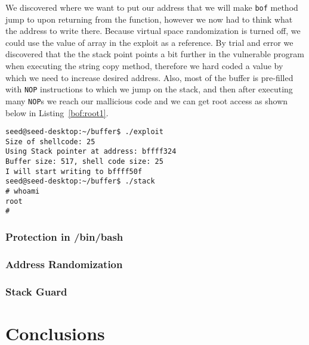 \documentclass[12pt, a4paper, pdflatex]{article}
\begin{document}
We discovered where we want to put our address that we will make \texttt{bof} method jump to upon returning from the function, however we now had to think what the address to write there. Because virtual space randomization is turned off, we could use the value of  array in the exploit as a reference. By trial and error we discovered that the the stack point points a bit further in the vulnerable program when executing the string copy method, therefore we hard coded a value by which we need to increase desired address. Also, most of the buffer is pre-filled with \texttt{NOP} instructions to which we jump on the stack, and then after executing many \texttt{NOP}s we reach our mallicious code and we can get root access as shown below in Listing~\ref{bof:root1}.
\vspace{1em}
\lstset{
	captionpos=b,
	frame=single,
	language=BASH,
	breaklines=true,
	caption=Function with buffer overflow vulnerability,
	label=bof:root1,
}
\begin{lstlisting}
seed@seed-desktop:~/buffer$ ./exploit 
Size of shellcode: 25
Using Stack pointer at address: bffff324
Buffer size: 517, shell code size: 25
I will start writing to bffff50f
seed@seed-desktop:~/buffer$ ./stack 
# whoami                                                                       
root
# 
\end{lstlisting}


\subsubsection{Protection in /bin/bash}

\lipsum[2]


\subsubsection{Address Randomization}

\lipsum[2]


\subsubsection{Stack Guard}

\lipsum[2]


\section{Conclusions}



\end{document}
